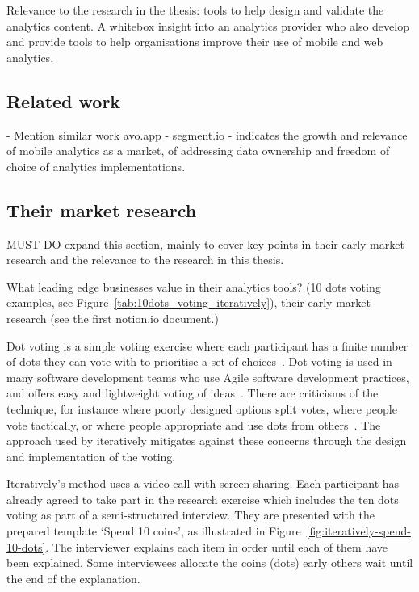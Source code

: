 Relevance to the research in the thesis: tools to help design and validate the analytics content. A whitebox insight into an analytics provider who also develop and provide tools to help organisations improve their use of mobile and web analytics. 


\subsection{Related work}
- Mention similar work avo.app
- segment.io - indicates the growth and relevance of mobile analytics as a market, of addressing data ownership and freedom of choice of analytics implementations. 

\subsection{Their market research}
MUST-DO expand this section, mainly to cover key points in their early market research and the relevance to the research in this thesis.

What leading edge businesses value in their analytics tools? (10 dots voting examples, see Figure~\ref{tab:10dots_voting_iteratively}), their early market research (see the first notion.io document.)


Dot voting is a simple voting exercise where each participant has a finite number of dots they can vote with to prioritise a set of choices~\citep{18f_dot_voting}. Dot voting is used in many software development teams who use Agile software development practices, and offers easy and lightweight voting of ideas~\citep{nngroup_dot_voting}. There are criticisms of the technique, for instance where poorly designed options split votes, where people vote tactically, or where people appropriate and use dots from others~\citep{dotmocracy}. The approach used by iteratively mitigates against these concerns through the design and implementation of the voting. 

Iteratively's method uses a video call with screen sharing. Each participant has already agreed to take part in the research exercise which includes the ten dots voting as part of a semi-structured interview. They are presented with the prepared template `Spend 10 coins', as illustrated in Figure~\ref{fig:iteratively-spend-10-dots}. The interviewer explains each item in order until each of them have been explained. Some interviewees allocate the coins (dots) early others wait until the end of the explanation.


